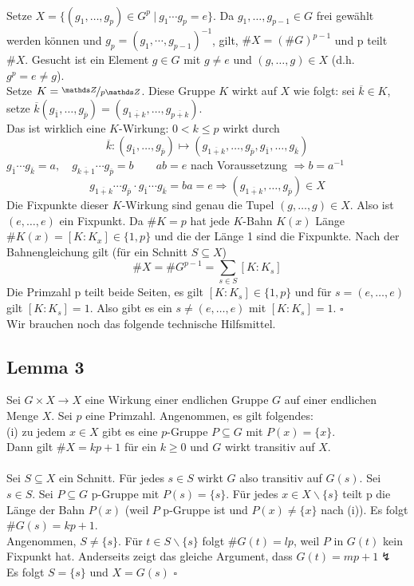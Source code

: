 \\
Setze $X=\{ (g_1,\dots,g_p)\in G^p~|~g_1\cdots g_p=e \}$. 
Da $g_1,\dots,g_{p-1}\in G$ frei gewählt werden können und $g_p=(g_1,\cdots,g_{p-1})^{-1}$, gilt, $\#X=(\#G)^{p-1}$ und p teilt $\#X$. 
Gesucht ist ein Element $g\in G$ mit $g\not= e$ und $(g,\dots,g)\in X$ (d.h. $g^p=e\not=g$).\\
Setze $K=\nicefrac{\Z}{p\Z}$. 
Diese Gruppe $K$ wirkt auf $X$ wie folgt: 
sei $\overline{k}\in K$, setze $\overline{k}(g_{\overline{1}},\dots,g_{\overline{p}})=(g_{\overline{1+k}},\dots,g_{\overline{p+k}})$.\\
Das ist wirklich eine $K$-Wirkung: 
$0<k\le p$ wirkt durch 
\[
\overline{k}:(g_{\overline{1}},\dots,g_{\overline{p}}) \mapsto (g_{\overline{1+k}},\dots,g_{\overline{p}},g_{\overline{1}},\dots,g_{\overline{k}})
\] 
$g_{\overline{1}}\cdots g_{\overline{k}}=a,\quad g_{\overline{k+1}}\cdots g_{\overline{p}}=b\qquad ab=e$ nach Voraussetzung $\Rightarrow b=a^{-1}$
\[
g_{\overline{1+k}}\cdots g_{\overline{p}}\cdot g_{\overline{1}}\cdots g_{\overline{k}} =ba=e \Rightarrow (g_{\overline{1+k}},\dots,g_{\overline{p}})\in X 
\]
Die Fixpunkte dieser $K$-Wirkung sind genau die Tupel $(g,\dots,g)\in X$. 
Also ist $(e,\dots,e)$ ein Fixpunkt. 
Da $\#K=p$ hat jede $K$-Bahn $K(x)$ Länge $\#K(x)=[K:K_x]\in \{1,p\}$ und die der Länge 1 sind die Fixpunkte. 
Nach der Bahnengleichung gilt (für ein Schnitt $S\subseteq X$) 
\[
\#X=\#G^{p-1}=\sum_{s\in S}[K:K_s] 
\]
Die Primzahl p teilt beide Seiten, es gilt $[K:K_s]\in \{1,p\}$ und für $s=(e,\dots,e)$ gilt $[K:K_s]=1$. 
Also gibt es ein $s\not=(e,\dots,e)$ mit $[K:K_s]=1$.
\hfill $\square$
\\

Wir brauchen noch das folgende technische Hilfsmittel.

\subsection{Lemma 3}
\label{sub:lemma_3}
Sei $G\times X\to X$ eine Wirkung einer endlichen Gruppe $G$ auf einer endlichen Menge $X$. 
Sei $p$ eine Primzahl. 
Angenommen, es gilt folgendes:\\
(i) zu jedem $x\in X$ gibt es eine $p$-Gruppe $P\subseteq G$ mit $P(x)=\{x\}$.\\
Dann gilt $\#X=kp+1$ für ein $k\ge0$ und $G$ wirkt transitiv auf $X$.\\

\\
Sei $S\subseteq X$ ein Schnitt. 
Für jedes $s\in S$ wirkt $G$ also transitiv auf $G(s)$. 
Sei $s\in S$. Sei $P\subseteq G$ p-Gruppe mit $P(s)=\{s\}$. 
Für jedes $x\in X\backslash\{s\}$ teilt p die Länge der Bahn $P(x)$ \big(weil $P$ p-Gruppe ist und $P(x)\not=\{x\}$ nach (i)\big). 
Es folgt $\#G(s)=kp+1$.\\
Angenommen, $S\not=\{s\}$. 
Für $t\in S\backslash\{s\}$ folgt $\#G(t)=lp$, weil $P$ in $G(t)$ kein Fixpunkt hat. 
Anderseits zeigt das gleiche Argument, dass $G(t)=mp+1\lightning$\\
Es folgt $S=\{s\}$ und $X=G(s)$
\hfill $\square$
\\

